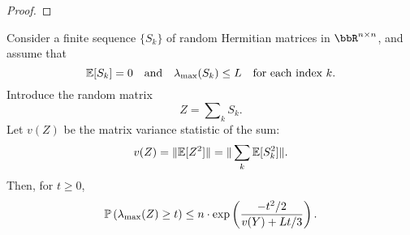 \documentclass[12pt]{article}
\begin{document}
\begin{proof}



\end{proof}


\begin{theorem} \label{thm:intdim-bernstein-herm}
	Consider a finite sequence $\{ S_k \}$ of random Hermitian matrices in $\RR^{n\times n}$, and assume that
	\begin{equation*}
	\E [S_k] = 0
	\quad\text{and}\quad
	\lambda_{\max}(S_k) \leq L
	\quad\text{for each index $k$.}
	\end{equation*}
	Introduce the random matrix
	\begin{equation*}
	Z = \sum\nolimits_k S_k.
	\end{equation*}
	Let $v(Z)$ be the matrix variance statistic of the sum:
	\begin{equation*}
	v(Z) = \|\E [Z^2]\| = \|\sum_k \E [S_k^2]\|.
	\end{equation*}
	Then, for $t \geq 0$,
	\begin{equation} \label{eqn:intdim-bernstein-tail}
	\Prob \left( \lambda_{\max}(Z) \geq t \right)
	\leq n \cdot \exp\left( \frac{-t^2/2}{v(Y) + Lt/3} \right).
	\end{equation}
	\label{thm:bernstein}
\end{theorem}
	
\end{document}
